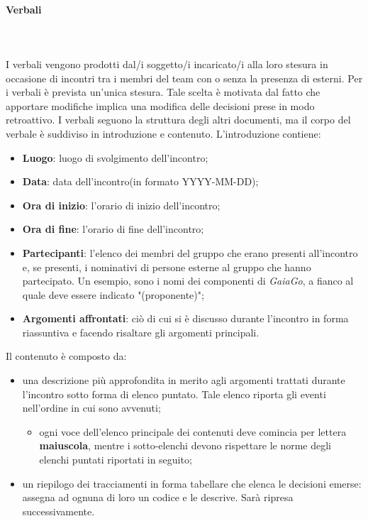 		\paragraph{Verbali} \mbox{}\\ \mbox{}\\
		I verbali vengono prodotti dal/i soggetto/i incaricato/i alla loro stesura in occasione di incontri tra i membri del team con o senza la presenza di esterni. Per i verbali è prevista un'unica stesura. Tale	scelta è motivata dal fatto che apportare modifiche implica una modifica delle decisioni prese in modo retroattivo.
		I verbali seguono la struttura degli altri documenti, ma il corpo del verbale è suddiviso in introduzione e contenuto.
		L'introduzione contiene:
		\begin{itemize}
			\item \textbf{Luogo}: luogo di svolgimento dell'incontro;
			\item \textbf{Data}: data dell'incontro(in formato YYYY-MM-DD);
			\item \textbf{Ora di inizio}: l'orario di inizio dell'incontro;
			\item \textbf{Ora di fine}: l'orario di fine dell'incontro;
			\item \textbf{Partecipanti}: l'elenco dei membri del gruppo che erano presenti all'incontro e, se presenti, i nominativi di persone esterne al gruppo che hanno partecipato. Un esempio, sono i nomi dei componenti di \textit{GaiaGo}, a fianco al quale deve essere indicato "(proponente)";
			\item \textbf{Argomenti affrontati}: ciò di cui si è discusso durante l'incontro in forma riassuntiva e facendo risaltare gli argomenti principali.
		\end{itemize}
	Il contenuto è composto da:
	\begin{itemize}
		\item una descrizione più approfondita in merito agli argomenti trattati durante l'incontro sotto forma di elenco puntato. Tale elenco riporta gli eventi nell'ordine in cui sono avvenuti;
		\begin{itemize}
			\item ogni voce dell'elenco principale dei contenuti deve comincia per lettera \textbf{maiuscola}, mentre i sotto-elenchi devono rispettare le norme degli elenchi puntati riportati in seguito;
		\end{itemize}
		
		\item un riepilogo dei tracciamenti in forma tabellare che elenca le decisioni emerse: assegna ad ognuna di loro un codice e le descrive. Sarà ripresa successivamente.
		
	\end{itemize}
